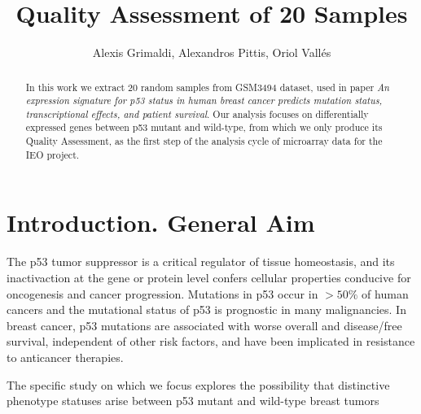 \documentclass{article}
\title{Quality Assessment of 20 Samples}
\author{Alexis Grimaldi, Alexandros Pittis, Oriol Vall\'{e}s}
\begin{document}
\maketitle %

\begin{abstract}
In this work we extract 20 random samples from GSM3494 dataset, used in paper {\it An expression signature for p53 status in human breast cancer predicts mutation status, transcriptional effects, and patient survival}. Our analysis focuses on differentially expressed genes between p53 mutant and wild-type, from which we only produce its Quality Assessment, as the first step of the analysis cycle of microarray data for the IEO project.
\end{abstract}


\section{Introduction. General Aim}
The p53 tumor suppressor is a critical regulator of tissue homeostasis, and its inactivaction at the gene or protein level confers cellular properties conducive for oncogenesis and cancer progression. Mutations in p53 occur in $>50 \%$ of human cancers and the mutational status of p53 is prognostic in many malignancies. In breast cancer, p53 mutations are associated with worse overall and disease/free survival, independent of other risk factors, and have been implicated in resistance to anticancer therapies.\par
The specific study on which we focus explores the possibility that distinctive phenotype statuses arise between p53 mutant and wild-type breast tumors
\end{document}
